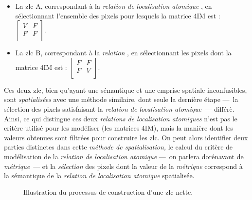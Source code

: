 \begin{itemize}
\item La \ac{zlc} \textcolor{RdBu-9-1}{\textsf{A}}, correspondant à la
  \emph{relation de localisation atomique}
  , en sélectionnant l'ensemble des pixels
  pour lesquels la matrice 4IM est :
  \(\left[\begin{smallmatrix}V&F\\F&F\\\end{smallmatrix}\right]\).
\item La \ac{zlc} \textcolor{RdBu-9-9}{\textsf{B}}, correspondant à la
  \emph{relation} , en sélectionnant les
  pixels dont la matrice 4IM est :
  \(\left[\begin{smallmatrix}F&F\\F&V\\\end{smallmatrix}\right]\).
\end{itemize}
%
Ces deux \ac{zlc}, bien qu'ayant une sémantique et une emprise
spatiale inconfusibles, sont \emph{spatialisées} avec une méthode
similaire, dont seule la dernière étape ---~la sélection des pixels
satisfaisant la \emph{relation de localisation atomique}~--- différè.
Ainsi, ce qui distingue ces deux \emph{relations de localisation
  atomiques} n'est pas le critère utilisé pour les modéliser (\ie les
matrices 4IM), mais la manière dont les valeurs obtenues sont filtrées
pour construire les \ac{zlc}. On peut alors identifier deux parties
distinctes dans cette \emph{méthode de spatialisation,} le calcul du
critère de modélisation de la \emph{relation de localisation atomique}
---~on parlera dorénavant de \emph{métrique}~--- et la
\emph{sélection} des pixels dont la valeur de la \emph{métrique}
correspond à la sémantique de la \emph{relation de localisation
  atomique} spatialisée.

\begin{figure}
  \centering
  
  \caption{Illustration du processus de construction d'une \ac{zlc}
    nette.}
  \label{fig:Exemple_Metrique_vs_Selecteur}
\end{figure}

